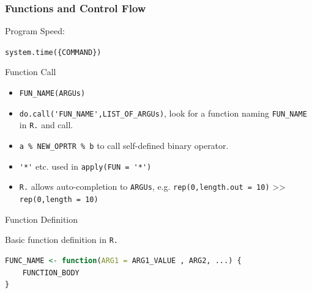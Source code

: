     




\subsubsection{Functions and Control Flow}
\begin{point}
    Program Speed:
\end{point}

\lstinline|system.time({COMMAND})|

\begin{point}
    Function Call
\end{point}
\begin{itemize}[topsep=2pt,itemsep=0pt]
    \item \lstinline|FUN_NAME(ARGUs)|
    \item \lstinline|do.call('FUN_NAME',LIST_OF_ARGUs)|, look for a function naming \lstinline|FUN_NAME| in \lstinline|R.| and call. 
    \item \lstinline|a % NEW_OPRTR % b| to call self-defined binary operator.
    \item \lstinline|'*'| etc. used in \lstinline|apply(FUN = '*')|
    \item \lstinline|R.| allows auto-completion to \lstinline|ARGUs|, e.g. \lstinline|rep(0,length.out = 10)| >> \lstinline|rep(0,length = 10)|
\end{itemize}


\begin{point}
    Function Definition
\end{point}

\begin{rcode}
    Basic function definition in \lstinline|R.|
\begin{lstlisting}[language=R]
FUNC_NAME <- function(ARG1 = ARG1_VALUE , ARG2, ...) {
    FUNCTION_BODY
}
\end{lstlisting}
\end{rcode}

